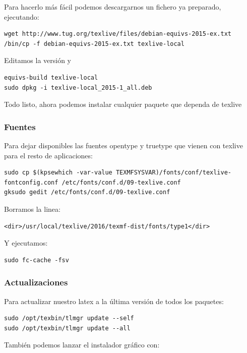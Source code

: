 \documentclass[12pt,spanish,]{article}
\begin{document}
Para hacerlo más fácil podemos descargarnos un fichero ya preparado,
ejecutando:

\begin{verbatim}
wget http://www.tug.org/texlive/files/debian-equivs-2015-ex.txt
/bin/cp -f debian-equivs-2015-ex.txt texlive-local
\end{verbatim}

Editamos la versión y

\begin{verbatim}
equivs-build texlive-local
sudo dpkg -i texlive-local_2015-1_all.deb
\end{verbatim}

Todo listo, ahora podemos instalar cualquier paquete que dependa de
texlive

\subsubsection{Fuentes}\label{fuentes}

Para dejar disponibles las fuentes opentype y truetype que vienen con
texlive para el resto de aplicaciones:

\begin{verbatim}
sudo cp $(kpsewhich -var-value TEXMFSYSVAR)/fonts/conf/texlive-fontconfig.conf /etc/fonts/conf.d/09-texlive.conf
gksudo gedit /etc/fonts/conf.d/09-texlive.conf
\end{verbatim}

Borramos la linea:

\begin{verbatim}
<dir>/usr/local/texlive/2016/texmf-dist/fonts/type1</dir>
\end{verbatim}

Y ejecutamos:

\begin{verbatim}
sudo fc-cache -fsv
\end{verbatim}

\subsubsection{Actualizaciones}\label{actualizaciones}

Para actualizar nuestro latex a la última versión de todos los paquetes:

\begin{verbatim}
sudo /opt/texbin/tlmgr update --self
sudo /opt/texbin/tlmgr update --all
\end{verbatim}

También podemos lanzar el instalador gráfico con:
\end{document}
